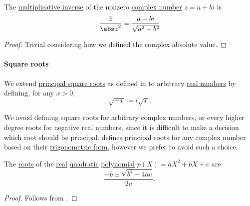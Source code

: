 \begin{proposition}\label{thm:complex_multiplicative_inverse}
  The \hyperref[def:semiring]{multiplicative inverse} of the nonzero \hyperref[def:complex_numbers]{complex number} \( z = a + bi \) is
  \begin{equation}\label{eq:thm:complex_multiplicative_inverse}
    \frac {\oline z} {{\abs z}^2} = \frac {a - bi} {\sqrt{a^2 + b^2}}
  \end{equation}
\end{proposition}
\begin{proof}
  Trivial considering how we defined the complex absolute value.
\end{proof}

\paragraph{Square roots}

\begin{definition}\label{def:principal_real_square_root}\mimprovised
  We extend \hyperref[def:nth_root]{principal square roots} as defined in  to arbitrary \hyperref[def:real_numbers]{real numbers} by defining, for any \( x > 0 \),
  \begin{equation}\label{eq:def:principal_real_square_root/negative}
    \sqrt {-x} \coloneqq i \sqrt x.
  \end{equation}
\end{definition}
\begin{comments}
  \item We avoid defining square roots for arbitrary complex numbers, or every higher degree roots for negative real numbers, since it is difficult to make a decision which root should be principal.  defines principal roots for any complex number based on their \hyperref[def:complex_numbers_trigonometric_form]{trigonometric form}, however we prefer to avoid such a choice.
\end{comments}

\begin{proposition}\label{thm:real_quadratic_polynomial_roots}
  The \hyperref[def:root_of_polynomial]{roots} of the \hyperref[def:real_numbers]{real} \hyperref[def:polynomial_degree_terminology]{quadratic} \hyperref[def:polynomial_algebra]{polynomial} \( p(X) = a X^2 + b X + c \) are
  \begin{equation}\label{eq:thm:real_quadratic_polynomial_roots}
    \frac {-b \pm \sqrt{b^2 - 4ac}} {2a}.
  \end{equation}
\end{proposition}
\begin{proof}
  Follows from .
\end{proof}

